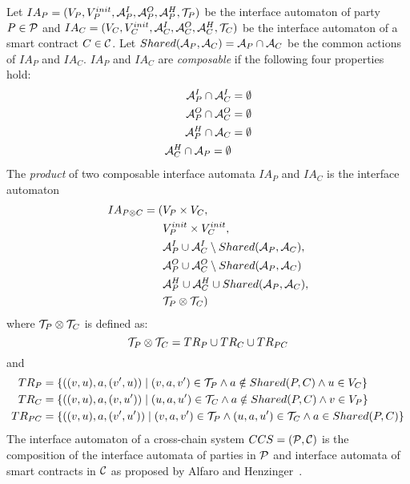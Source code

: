  Let $IA_P=(V_P, V_P^{init}, {\mathcal A}_P^I, {\mathcal A}_P^O, {\mathcal A}_P^H, {\mathcal T}_P)$ be the interface automaton of party $P \in {\mathcal P}$ and $IA_C=(V_C, V_C^{init}, {\mathcal A}_C^I, {\mathcal A}_C^O, {\mathcal A}_C^H, {\mathcal T}_C)$ be the interface automaton of a smart contract $C \in {\mathcal C}$. 
 Let $Shared({\mathcal A}_P, {\mathcal A}_C)={\mathcal A}_P \cap {\mathcal A}_C$ be the common actions of $IA_P$ and $IA_C$. 
 $IA_P$ and $IA_C$ are \emph{composable} if the following four properties hold:
 \begin{align*}
   {\mathcal A}_P^I \cap {\mathcal A}_C^I &= \emptyset\\
   {\mathcal A}_P^O \cap {\mathcal A}_C^O &= \emptyset\\
   {\mathcal A}_P^H \cap {\mathcal A}_C &= \emptyset\\
   {\mathcal A}_C^H \cap {\mathcal A}_P = \emptyset
 \end{align*}
 The \emph{product}  of two composable interface automata $IA_P$ and $IA_C$ is the interface automaton
 \begin{align*}
   IA_{P \otimes C}=(&V_P \times V_C,\\
                  &V_P^{init} \times V_C^{init},\\
                  &{\mathcal A}_P^I \cup {\mathcal A}_C^I \setminus  Shared({\mathcal A}_P, {\mathcal A}_C),\\
                  &{\mathcal A}_P^O \cup {\mathcal A}_C^O \setminus  Shared({\mathcal A}_P, {\mathcal A}_C)\\
                  &{\mathcal A}_P^H \cup {\mathcal A}_C^H \cup  Shared({\mathcal A}_P, {\mathcal A}_C),\\
                  &{\mathcal T}_P \otimes  {\mathcal T}_C)
    \end{align*}
 where ${\mathcal T}_P \otimes  {\mathcal T}_C$ is defined as:
 \begin{equation*}
{\mathcal T}_P \otimes  {\mathcal T}_C = TR_P \cup TR_C \cup TR_{PC}
 \end{equation*}
and
 \begin{align*}
 TR_P &=\left\{ ((v,u),a,(v^\prime,u)) \mid (v,a,v^\prime) \in {\mathcal T}_P \wedge a \notin Shared(P,C) \wedge u \in V_C \right\}\\
 TR_C &=\left\{ ((v,u),a,(v,u^\prime))  \mid  (u,a,u^\prime) \in {\mathcal T}_C \wedge a \notin Shared(P,C) \wedge v \in V_P \right\}\\
 TR_{PC}&=\left\{ ((v,u),a,(v^\prime,u^\prime))  \mid  (v,a,v^\prime) \in {\mathcal T}_P \wedge (u,a,u^\prime) \in {\mathcal T}_C \wedge a \in Shared(P,C) \right\}
 \end{align*}
The interface automaton of a cross-chain system $CCS=({\mathcal P},{\mathcal C})$ is 
the composition of the interface automata of parties in ${\mathcal P}$ and interface automata of smart contracts in ${\mathcal C}$ as proposed by Alfaro and Henzinger~\cite{AlfaroH01}.
 
